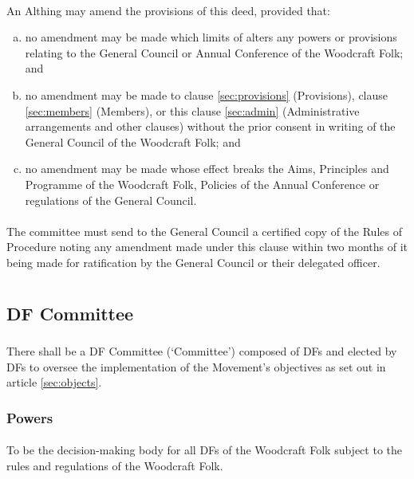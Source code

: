 \documentclass[a4paper, 12pt]{report}
\begin{document}
\subsubsection{}
An Althing may amend the provisions of this deed, provided that:
\begin{enumerate}[(a)]
\item no amendment may be made which limits of alters any powers or provisions relating to the General Council or Annual Conference of the Woodcraft Folk; and
\item no amendment may be made to clause \ref{sec:provisions} (Provisions), clause \ref{sec:members} (Members), or this clause \ref{sec:admin} (Administrative arrangements and other clauses) without the prior consent in writing of the General Council of the Woodcraft Folk; and
\item no amendment may be made whose effect breaks the Aims, Principles and Programme of the Woodcraft Folk, Policies of the Annual Conference or regulations of the General Council.
\end{enumerate}
\subsubsection{}
The committee must send to the General Council a certified copy of the Rules of Procedure noting any amendment made under this clause within two months of it being made for ratification by the General Council or their delegated officer.

\chapter{}
\section{DF Committee}
\subsection{}
There shall be a DF Committee (`Committee') composed of DFs and elected by DFs to oversee the implementation of the Movement's objectives as set out in article \ref{sec:objects}.

\subsection{Powers}
\subsubsection{}
To be the decision-making body for all DFs of the Woodcraft Folk subject to the rules and regulations of the Woodcraft Folk.
\end{document}
